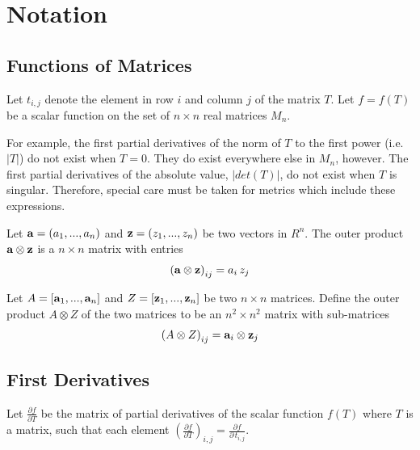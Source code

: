 \documentclass{report}
\begin{document}
\chapter{Notation}

\section{Functions of Matrices}

Let $t_{i,j}$ denote the element in row $i$ and column $j$ of the matrix $T$.
Let $f=f(T)$ be a scalar function on the set of $n \times n$ real matrices 
$M_n$. \newline

 For example, the first partial
derivatives of the norm of $T$ to the first power (i.e. $|T|$) do not exist 
when $T=0$. 
They do exist everywhere else in $M_n$, however.  The first partial 
derivatives of 
the absolute value, $|det(T)|$, do not exist when $T$ is singular. Therefore,
special care must be taken for metrics which include these expressions. 
\newline

 \newline
Let ${\bf a}=(a_1,...,a_n)$ and ${\bf z}=(z_1,...,z_n)$ be two vectors in 
$R^n$.  The outer product ${\bf a} \otimes {\bf z}$ is a $n \times n$ matrix 
with entries
\begin{eqnarray}
\left( {\bf a} \otimes {\bf z} \right)_{ij} = a_i \, z_j
\end{eqnarray}

\noindent Let $A = [{\bf a}_1,...,{\bf a}_n]$ and 
$Z = [{\bf z}_1,...,{\bf z}_n]$ be two $n \times n$ matrices.  Define the 
outer product $A \otimes Z$ of the two matrices to be an $n^2 \times n^2$ 
matrix with sub-matrices
\begin{eqnarray}
\label{matrixouter}
\left( A \otimes Z \right)_{ij} = {\bf a}_i \otimes {\bf z}_j
\end{eqnarray}

\section{First Derivatives}

Let $\frac{\partial f}{\partial T}$ be the matrix of partial derivatives of the scalar function $f(T)$ where $T$ is a matrix, such that each element 
$\left(\frac{\partial f}{\partial T}\right)_{i,j} = \frac{\partial f}{\partial \, t_{i,j}}$.
\end{document}
